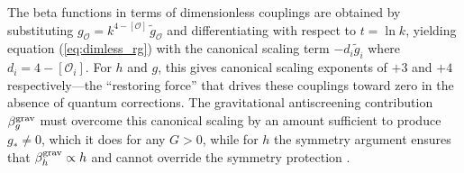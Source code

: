 \documentclass[12pt,a4paper]{article}
\begin{document}
The beta functions in terms of dimensionless couplings are obtained by
substituting $g_{\mathcal O} = k^{4-[\mathcal O]}\,\tilde g_{\mathcal O}$
and differentiating with respect to $t = \ln k$, yielding equation
(\ref{eq:dimless_rg}) with the canonical scaling term $-d_i\tilde g_i$
where $d_i = 4 - [\mathcal{O}_i]$. For $h$ and $g$, this gives canonical
scaling exponents of $+3$ and $+4$ respectively---the ``restoring force''
that drives these couplings toward zero in the absence of quantum corrections.
The gravitational antiscreening contribution $\beta_g^{\rm grav}$ must
overcome this canonical scaling by an amount sufficient to produce $g_* \neq 0$,
which it does for any $G > 0$, while for $h$ the symmetry argument ensures
that $\beta_h^{\rm grav} \propto h$ and cannot override the symmetry protection
\cite{EichhornLinoWagner2023,EichhornSchiffer2022handbook}.

\newpage
\end{document}
